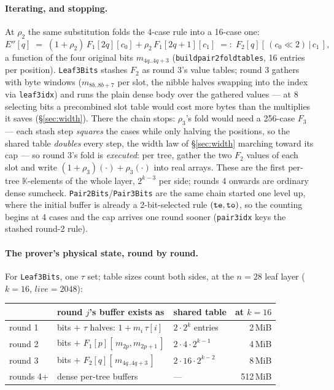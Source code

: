 \documentclass[11pt]{article}
\newcommand{\K}{\mathbb{K}}            %
\newcommand{\code}[1]{{\def\_{\textunderscore\allowbreak}\texttt{#1}}}
\theoremstyle{definition}
\begin{document}
\paragraph{Iterating, and stopping.}
At $\rho_2$ the same substitution folds the 4-case rule into a
16-case one:
\[
  E''[q] \;=\; (1{+}\rho_2)\,F_1[2q][c_0] + \rho_2\,F_1[2q{+}1][c_1]
  \;=:\; F_2[q][\,(c_0{\ll}2) \,|\, c_1\,],
\]
a function of the four original bits $m_{4q..4q+3}$
(\code{build\_pair2\_fold\_tables}, 16 entries per position).
\code{Leaf3Bits} stashes $F_2$ as round 3's value tables; round 3
gathers with byte windows ($m_{8b..8b+7}$ per slot, the nibble halves
swapping into the index via \code{leaf3\_idx}) and runs the plain
dense body over the gathered values --- at 8 selecting bits a
precombined slot table would cost more bytes than the multiplies it
saves (\S\ref{sec:width}).  There the chain stops: $\rho_3$'s fold
would need a 256-case $F_3$ --- each stash step \emph{squares} the
cases while only halving the positions, so the shared table
\emph{doubles} every step, the width law of \S\ref{sec:width} marching
toward its cap --- so round 3's fold is \emph{executed}: per tree,
gather the two $F_2$ values of each slot and write
$(1{+}\rho_3)(\cdot) + \rho_3(\cdot)$ into real arrays.  These are the
first per-tree $\K$-elements of the whole layer, $2^{k-3}$ per side;
rounds 4 onwards are ordinary dense sumcheck.
\code{Pair2Bits}/\code{Pair3Bits} are the same chain started one level
up, where the initial buffer is already a 2-bit-selected rule
$(\code{te}, \code{to})$, so the counting begins at 4 cases and the
cap arrives one round sooner (\code{pair3\_idx} keys the stashed
round-2 rule).

\paragraph{The prover's physical state, round by round.}
For \code{Leaf3Bits}, one $\tau$ set; table sizes count both sides, at
the $n = 28$ leaf layer ($k = 16$, $\mathit{live} = 2048$):

\begin{center}
\small
\begin{tabular}{lllr}
\toprule
 & round $j$'s buffer exists as & shared table & at $k{=}16$ \\
\midrule
round 1 & bits $+$ $\tau$ halves: $1 + m_i\,\tau[i]$ &
  $2\cdot 2^k$ entries & 2\,MiB \\
round 2 & bits $+$ $F_1[p][\,m_{2p}, m_{2p+1}\,]$ &
  $2\cdot 4\cdot 2^{k-1}$ & 4\,MiB \\
round 3 & bits $+$ $F_2[q][\,m_{4q..4q+3}\,]$ &
  $2\cdot 16\cdot 2^{k-2}$ & 8\,MiB \\
rounds 4+ & dense per-tree buffers & --- & 512\,MiB \\
\bottomrule
\end{tabular}
\end{center}
\end{document}
